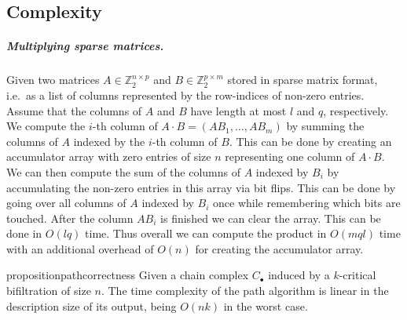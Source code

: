 \subsection{Complexity}
\label{app:path_complexity}
%
\subparagraph{Multiplying sparse matrices.} Given two matrices $A\in\mathbb{Z}_2^{n\times p}$ and $B\in\mathbb{Z}_2^{p\times m}$ stored in sparse matrix format, i.e.\ as a list of columns represented by the row-indices of non-zero entries. Assume that the columns of $A$ and $B$ have length at most $l$ and $q$, respectively. We compute the $i$-th column of $A\cdot B=(AB_1,\ldots,AB_m)$ by summing the columns of $A$ indexed by the $i$-th column of $B$. This can be done by creating an accumulator array with zero entries of size $n$ representing one column of $A\cdot B$. We can then compute the sum of the columns of $A$ indexed by $B_i$ by accumulating the non-zero entries in this array via bit flips. This can be done by going over all columns of $A$ indexed by $B_i$ once while remembering which bits are touched. After the column $AB_i$ is finished we can clear the array. This can be done in $O(lq)$ time. Thus overall we can compute the product in $O(mql)$ time with an additional overhead of $O(n)$ for creating the accumulator array.
%
%
%
%
%
\begin{restatable}{proposition}{pathcorrectness}
\label{prop:path_complexity}
Given a chain complex $C_\bullet$ induced by a $k$-critical bifiltration of size $n$. The time complexity of the path algorithm is linear in the description size of its output, being $O(nk)$ in the worst case. 
\end{restatable}
